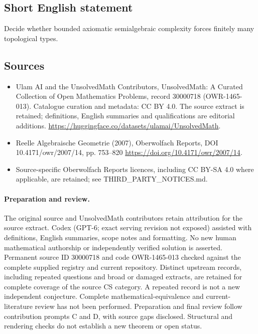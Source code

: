 \documentclass[11pt]{article}
\begin{document}
\subsection{Short English statement}
Decide whether bounded axiomatic semialgebraic complexity forces finitely many topological types.
\subsection{Sources}
\begin{itemize}
\item[\hypertarget{source:30000718:1}{S1}] Ulam AI and the UnsolvedMath Contributors, UnsolvedMath: A Curated Collection of Open Mathematics Problems, record 30000718 (OWR-1465-013). Catalogue curation and metadata: CC BY 4.0. The source extract is retained; definitions, English summaries and qualifications are editorial additions.
\url{https://huggingface.co/datasets/ulamai/UnsolvedMath}.
\item[\hypertarget{source:30000718:2}{S2}] Reelle Algebraische Geometrie (2007), Oberwolfach Reports, DOI 10.4171/owr/2007/14, pp. 753--820
\url{https://doi.org/10.4171/owr/2007/14}.
\item Source-specific Oberwolfach Reports licences, including CC BY-SA 4.0 where applicable, are retained; see THIRD\_PARTY\_NOTICES.md.
\end{itemize}
\paragraph{Preparation and review.}
The original source and UnsolvedMath contributors retain attribution for the source extract. Codex (GPT-6; exact serving revision not exposed) assisted with definitions, English summaries, scope notes and formatting. No new human mathematical authorship or independently verified solution is asserted. Permanent source ID 30000718 and code OWR-1465-013 checked against the complete supplied registry and current repository. Distinct upstream records, including repeated questions and broad or damaged extracts, are retained for complete coverage of the source CS category. A repeated record is not a new independent conjecture. Complete mathematical-equivalence and current-literature review has not been performed. Preparation and final review follow contribution prompts C and D, with source gaps disclosed. Structural and rendering checks do not establish a new theorem or open status.
\label{end:30000718}
\end{document}
